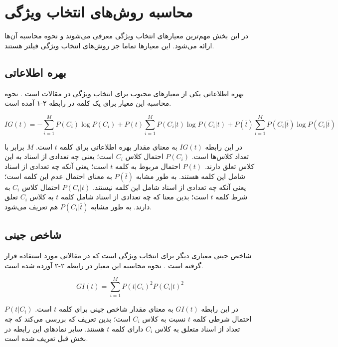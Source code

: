 \section{محاسبه روش‌های انتخاب ویژگی}
در این بخش مهم‌ترین معیار‌های انتخاب ویژگی معرفی می‌شوند و نحوه محاسبه آن‌ها ارائه می‌شود. این معیار‌ها تماما جز روش‌های انتخاب ویژگی فیلتر هستند.

\subsection{بهره اطلاعاتی}
بهره اطلاعاتی
یکی از معیارهای محبوب برای انتخاب ویژگی در مقالات است
\cite{labani2018novel}\cite{uysal2016improved}.
نحوه محاسبه این معیار برای یک کلمه در رابطه ۲-۱ آمده است.

\begin{equation}
IG(t) = -\sum_{i=1}^M P(C_i)\log{P(C_i)} + P(t)\sum_{i=1}^M P(C_i|t)\log{P(C_i|t)} + P(\bar{t})\sum_{i=1}^M P(C_i|\bar{t})\log{P(C_i|\bar{t})}
\end{equation}

در این رابطه
$IG(t)$
به معنای مقدار بهره اطلاعاتی برای کلمه
$t$
است. 
$M$
  برابر با تعداد کلاس‌ها است.
$P(C_i)$
احتمال کلاس
$C_i$
است؛ یعنی چه تعدادی از اسناد به این کلاس تعلق دارند.
$P(t)$
احتمال مربوط به کلمه
$t$
است؛ یعنی آنکه چه تعدادی از اسناد شامل این کلمه هستند. به طور مشابه 
$P(\bar{t})$
به معنای احتمال عدم این کلمه است؛ یعنی آنکه چه تعدادی از اسناد شامل این کلمه نیستند.
$P(C_i|t)$
احتمال کلاس
$C_i$
به شرط کلمه
$t$
است؛ بدین معنا که چه تعدادی از اسناد شامل کلمه
$t$
به کلاس
$C_i$
تعلق دارند.
به طور مشابه
$P(C_i|\bar{t})$
هم تعریف می‌شود.

\subsection{شاخص جینی}
 شاخص جینی
معیاری دیگر برای انتخاب ویژگی است که در مقالاتی مورد استفاده قرار گرفته است
\cite{labani2018novel}\cite{uysal2016improved}.
نحوه محاسبه این معیار در رابطه ۲-۲ آورده شده است.

\begin{equation}
GI(t) = \sum_{i=1}^M P(t|C_i)^2 P(C_i|t)^2
\end{equation}

در این رابطه 
$GI(t)$
به معنای مقدار شاخص جینی برای کلمه
$t$
است. 
$P(t|C_i)$
احتمال شرطی کلمه 
$t$
نسبت به کلاس
$C_i$
است؛ بدین تعریف که بررسی می‌کند که چه تعداد از اسناد متعلق به کلاس 
$C_i$
دارای کلمه
$t$
هستند. سایر نماد‌های این رابطه در بخش قبل تعریف شده است.

